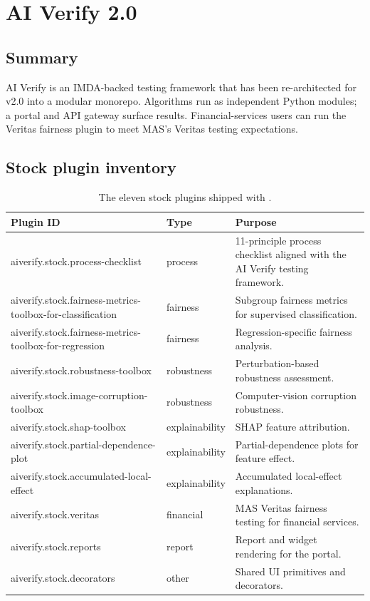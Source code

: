 \section{AI Verify 2.0}

\subsection*{Summary}

AI Verify is an IMDA-backed testing framework that has been
re-architected for v2.0 into a modular monorepo. Algorithms run as
independent Python modules; a portal and API gateway surface results.
Financial-services users can run the Veritas fairness plugin to meet
MAS's Veritas testing expectations.

\subsection*{Stock plugin inventory}

\begin{table}[h]
\centering
\small
\begin{tabularx}{\textwidth}{p{5.4cm}p{2.4cm}X}
\toprule
\textbf{Plugin ID} & \textbf{Type} & \textbf{Purpose} \\
\midrule
aiverify.stock.process-checklist & process &
  11-principle process checklist aligned with the AI Verify testing framework. \\
aiverify.stock.fairness-metrics-toolbox-for-classification & fairness &
  Subgroup fairness metrics for supervised classification. \\
aiverify.stock.fairness-metrics-toolbox-for-regression & fairness &
  Regression-specific fairness analysis. \\
aiverify.stock.robustness-toolbox & robustness &
  Perturbation-based robustness assessment. \\
aiverify.stock.image-corruption-toolbox & robustness &
  Computer-vision corruption robustness. \\
aiverify.stock.shap-toolbox & explainability &
  SHAP feature attribution. \\
aiverify.stock.partial-dependence-plot & explainability &
  Partial-dependence plots for feature effect. \\
aiverify.stock.accumulated-local-effect & explainability &
  Accumulated local-effect explanations. \\
aiverify.stock.veritas & financial &
  MAS Veritas fairness testing for financial services. \\
aiverify.stock.reports & report &
  Report and widget rendering for the portal. \\
aiverify.stock.decorators & other &
  Shared UI primitives and decorators. \\
\bottomrule
\end{tabularx}
\caption{The eleven stock plugins shipped with .}
\label{tab:av-plugins}
\end{table}

